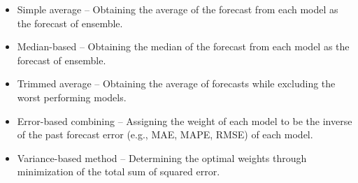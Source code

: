 \begin{itemize}
\item Simple average -- Obtaining the average of the forecast from each model as the forecast of ensemble.
\item Median-based -- Obtaining the median of the forecast from each model as the forecast of ensemble.
\item Trimmed average -- Obtaining the average of forecasts while excluding the worst performing models.
\item Error-based combining -- Assigning the weight of each model to be the inverse of the past forecast error (e.g., MAE, MAPE, RMSE) of each model.
\item Variance-based method -- Determining the optimal weights through minimization of the total sum of squared error.
\end{itemize}